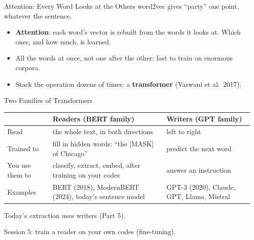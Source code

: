\documentclass[svgnames,x11names,dvipsnames]{beamer}
\newcommand{\new}[1]{#1}
\begin{document}
\begin{frame}{\new{Attention: Every Word Looks at the Others}}
\small
word2vec gives ``party'' one point, whatever the sentence.

\vspace{0.3cm}
\centering
{}

\vspace{0.4cm}
\raggedright
\begin{itemize}
    \setlength{\itemsep}{4pt}
    \item \textbf{Attention}: each word's vector is rebuilt from the words it looks at. Which ones, and how much, is learned.
    \item All the words at once, not one after the other: fast to train on enormous corpora.
    \item Stack the operation dozens of times: a \textbf{transformer} (Vaswani et al.\ 2017).
\end{itemize}
\end{frame}

\begin{frame}{\new{Two Families of Transformers}}
\footnotesize
\renewcommand{\arraystretch}{1.6}
\begin{tabular}{@{}>{\raggedright\arraybackslash}p{2.0cm}>{\raggedright\arraybackslash}p{4.0cm}>{\raggedright\arraybackslash}p{4.0cm}@{}}
\toprule
& \textbf{Readers} (BERT family) & \textbf{Writers} (GPT family) \\
\midrule
Read & the whole text, in both directions & left to right \\
Trained to & fill in hidden words: ``the [MASK] of Chicago'' & predict the next word \\
You use them to & classify, extract, embed, after training on your codes & answer an instruction \\
Examples & BERT (2018), ModernBERT (2024), today's sentence model & GPT-3 (2020), Claude, GPT, Llama, Mistral \\
\bottomrule
\end{tabular}

\vspace{0.5cm}
\small
\new{Today's extraction uses writers (Part 5).}

\vspace{0.2cm}
Session 5: train a reader on your own codes (fine-tuning).
\end{frame}
\end{document}
